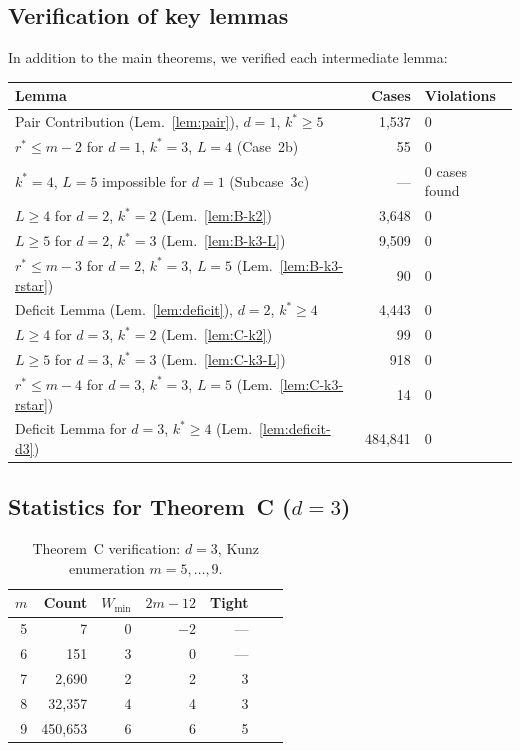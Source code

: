 \documentclass[11pt]{amsart}
\theoremstyle{definition}
\theoremstyle{remark}
\begin{document}
\subsection{Verification of key lemmas}

In addition to the main theorems, we verified each intermediate lemma:

\begin{center}
\begin{tabular}{lrl}
\toprule
\textbf{Lemma} & \textbf{Cases} & \textbf{Violations} \\
\midrule
Pair Contribution (Lem.~\ref{lem:pair}), $d=1$, $k^*\ge 5$ & 1{,}537 & 0 \\
$r^* \le m-2$ for $d=1$, $k^*=3$, $L=4$ (Case~2b) & 55 & 0 \\
$k^*=4$, $L=5$ impossible for $d=1$ (Subcase~3c) & --- & 0 cases found \\
$L \ge 4$ for $d=2$, $k^*=2$ (Lem.~\ref{lem:B-k2}) & 3{,}648 & 0 \\
$L \ge 5$ for $d=2$, $k^*=3$ (Lem.~\ref{lem:B-k3-L}) & 9{,}509 & 0 \\
$r^* \le m-3$ for $d=2$, $k^*=3$, $L=5$ (Lem.~\ref{lem:B-k3-rstar}) & 90 & 0 \\
Deficit Lemma (Lem.~\ref{lem:deficit}), $d=2$, $k^*\ge 4$ & 4{,}443 & 0 \\
$L \ge 4$ for $d=3$, $k^*=2$ (Lem.~\ref{lem:C-k2}) & 99 & 0 \\
$L \ge 5$ for $d=3$, $k^*=3$ (Lem.~\ref{lem:C-k3-L}) & 918 & 0 \\
$r^* \le m-4$ for $d=3$, $k^*=3$, $L=5$ (Lem.~\ref{lem:C-k3-rstar}) & 14 & 0 \\
Deficit Lemma for $d=3$, $k^*\ge 4$ (Lem.~\ref{lem:deficit-d3}) & 484{,}841 & 0 \\
\bottomrule
\end{tabular}
\end{center}

\subsection{Statistics for Theorem~C ($d=3$)}

\begin{table}[ht]
\centering
\caption{Theorem~C verification: $d = 3$, Kunz enumeration $m = 5, \ldots, 9$.}\label{tab:thC-stats}
\begin{tabular}{rrrrrrr}
\toprule
$m$ & Count & $W_{\min}$ & $2m-12$ & Tight \\
\midrule
 5 &       7 &  0 & $-2$ & --- \\
 6 &     151 &  3 &  0 &  --- \\
 7 &  2{,}690 &  2 &  2 &  3 \\
 8 & 32{,}357 &  4 &  4 &  3 \\
 9 & 450{,}653 &  6 &  6 &  5 \\
\bottomrule
\end{tabular}
\end{table}
\end{document}
